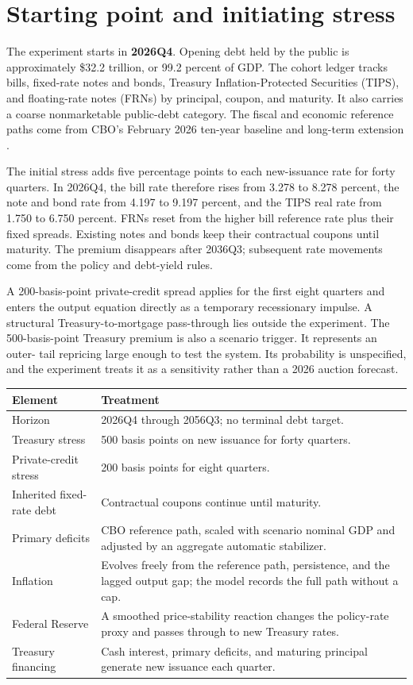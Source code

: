 \documentclass[11pt]{article}
\begin{document}
\section{Starting point and initiating stress}

The experiment starts in \textbf{2026Q4}.  Opening debt held by the public is approximately
\$32.2 trillion, or 99.2 percent of GDP.  The cohort ledger tracks bills, fixed-rate notes
and bonds, Treasury Inflation-Protected Securities (TIPS), and floating-rate notes (FRNs) by
principal, coupon, and maturity.  It also carries a coarse nonmarketable public-debt
category.  The fiscal and economic reference paths come from CBO's February 2026 ten-year
baseline and long-term extension \cite{cbo2026,cboLongTerm}.

The initial stress adds five percentage points to each new-issuance rate for forty quarters.
In 2026Q4, the bill rate therefore rises from 3.278 to 8.278 percent, the note and
bond rate from 4.197 to 9.197 percent, and the TIPS real rate from 1.750 to 6.750 percent.
FRNs reset from the higher bill reference rate plus their fixed spreads.  Existing notes and
bonds keep their contractual coupons until maturity.  The premium disappears after 2036Q3;
subsequent rate movements come from the policy and debt-yield rules.

A 200-basis-point private-credit spread applies for the first eight quarters and enters the
output equation directly as a temporary recessionary impulse.  A structural
Treasury-to-mortgage pass-through lies outside the experiment.
The 500-basis-point Treasury premium is also a scenario trigger.  It represents an outer-
tail repricing large enough to test the system.  Its probability is unspecified, and the
experiment treats it as a sensitivity rather than a 2026 auction forecast.

\begin{center}
\begin{tabular}{p{}p{}}
\toprule
Element & Treatment \\
\midrule
Horizon & 2026Q4 through 2056Q3; no terminal debt target. \\
Treasury stress & 500 basis points on new issuance for forty quarters. \\
Private-credit stress & 200 basis points for eight quarters. \\
Inherited fixed-rate debt & Contractual coupons continue until maturity. \\
Primary deficits & CBO reference path, scaled with scenario nominal GDP and adjusted by an
aggregate automatic stabilizer. \\
Inflation & Evolves freely from the reference path, persistence, and the lagged output gap;
the model records the full path without a cap. \\
Federal Reserve & A smoothed price-stability reaction changes the policy-rate proxy and
passes through to new Treasury rates. \\
Treasury financing & Cash interest, primary deficits, and maturing principal generate new
issuance each quarter. \\
\bottomrule
\end{tabular}
\end{center}
\end{document}
